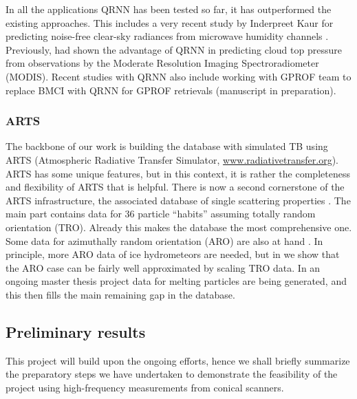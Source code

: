 \documentclass[12pt,oneside,a4paper]{article}
\begin{document}

In all the applications QRNN has been tested so far, it has outperformed the existing approaches. This includes a very recent study by Inderpreet Kaur for predicting noise-free clear-sky radiances from microwave humidity channels \citep{kaur:2021:canma}. Previously, \citet{pfreundschuh:aneur:18} had shown the advantage of QRNN in predicting cloud top pressure from observations by the Moderate Resolution Imaging Spectroradiometer (MODIS). Recent studies with QRNN also include working with GPROF team to replace BMCI with QRNN for GPROF retrievals (manuscript in preparation).


\subsubsection{ARTS}
\label{sec:arts}
% 
The backbone of our work is building the database with simulated TB using ARTS
(Atmospheric Radiative Transfer Simulator, \url{www.radiativetransfer.org}).
ARTS has some unique features, but in this context, it is rather the
completeness and flexibility of ARTS that is helpful. There is now a second
cornerstone of the ARTS infrastructure, the associated database of single
scattering properties \citep{eriksson:agene:18}. The main part contains data
for 36 particle ``habits'' assuming totally random orientation (TRO). Already
this makes the database the most comprehensive one. Some data for azimuthally
random orientation (ARO) are also at hand
\citep{brath:micro:20,ekelund:micro:20}. In principle, more ARO data of ice
hydrometeors are needed, but in \citet{baralakas:intro:21} we show that the ARO
case can be fairly well approximated by scaling TRO data. In an ongoing master
thesis project data for melting particles are being generated, and this then
fills the main remaining gap in the database.

\subsection{Preliminary results}
%
This project will build upon the ongoing efforts, hence we shall briefly summarize the preparatory steps we have undertaken to demonstrate the feasibility of the project using high-frequency measurements from conical scanners.
\end{document}
